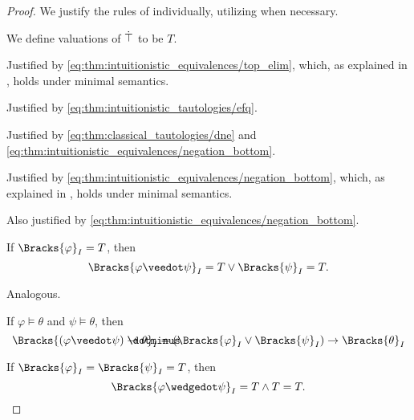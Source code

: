 \begin{proof}
  We justify the rules of  individually, utilizing  when necessary.

   We define valuations of \( \dot{\top} \) to be \( T \).

   Justified by \eqref{eq:thm:intuitionistic_equivalences/top_elim}, which, as explained in , holds under minimal semantics.

   Justified by \eqref{eq:thm:intuitionistic_tautologies/efq}.

   Justified by \eqref{eq:thm:classical_tautologies/dne} and \eqref{eq:thm:intuitionistic_equivalences/negation_bottom}.

   Justified by \eqref{eq:thm:intuitionistic_equivalences/negation_bottom}, which, as explained in , holds under minimal semantics.

   Also justified by \eqref{eq:thm:intuitionistic_equivalences/negation_bottom}.

   If \( \Bracks{\varphi}_I = T \), then
  \begin{equation*}
    \Bracks{\varphi \synvee \psi}_I = T \vee \Bracks{\psi}_I = T.
  \end{equation*}

   Analogous.

   If \( \varphi \vDash \theta \) and \( \psi \vDash \theta \), then
  \begin{equation*}
    \Bracks{(\varphi \synvee \psi) \synimplies \theta}_I
    =
    (\Bracks{\varphi}_I \vee \Bracks{\psi}_I) \rightarrow \Bracks{\theta}_I
  \end{equation*}

   If \( \Bracks{\varphi}_I = \Bracks{\psi}_I = T \), then
  \begin{equation*}
    \Bracks{\varphi \synwedge \psi}_I = T \wedge T = T.
  \end{equation*}


\end{proof}
